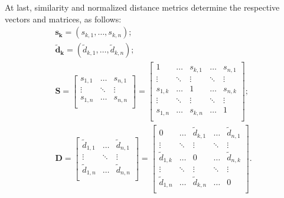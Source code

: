 \documentclass{elsarticle} %
\begin{document}
At last, similarity and normalized distance metrics determine the respective
vectors and matrices, as follows:
\begin{gather}
    \boldsymbol{s_k} = (s_{k,1}, \dots, s_{k,n})
    ;\\
    \boldsymbol{\tilde{d}_k} = (\tilde{d}_{k,1}, \dots, \tilde{d}_{k,n})
    ;\\
    \textbf{S} =
    \begin{bmatrix}
        s_{1,1} & \hdots & s_{n,1} \\
        \vdots  & \ddots & \vdots  \\
        s_{1,n} & \hdots & s_{n,n} \\
    \end{bmatrix} =
    \begin{bmatrix}
        1       & \hdots & s_{k,1} & \hdots & s_{n,1} \\
        \vdots  & \ddots & \vdots  & \ddots & \vdots  \\
        s_{1,k} & \hdots & 1       & \hdots & s_{n,k} \\
        \vdots  & \ddots & \vdots  & \ddots & \vdots  \\
        s_{1,n} & \hdots & s_{k,n} & \hdots & 1       \\
    \end{bmatrix}
    ;\\
    \textbf{D} =
    \begin{bmatrix}
        \tilde{d}_{1,1} & \hdots & \tilde{d}_{n,1} \\
        \vdots          & \ddots & \vdots          \\
        \tilde{d}_{1,n} & \hdots & \tilde{d}_{n,n} \\
    \end{bmatrix} =
    \begin{bmatrix}
        0               & \hdots & \tilde{d}_{k,1} & \hdots & \tilde{d}_{n,1} \\
        \vdots          & \ddots & \vdots          & \ddots & \vdots          \\
        \tilde{d}_{1,k} & \hdots & 0               & \hdots & \tilde{d}_{n,k} \\
        \vdots          & \ddots & \vdots          & \ddots & \vdots          \\
        \tilde{d}_{1,n} & \hdots & \tilde{d}_{k,n} & \hdots & 0               \\
    \end{bmatrix}
    .
\end{gather}
\end{document}
